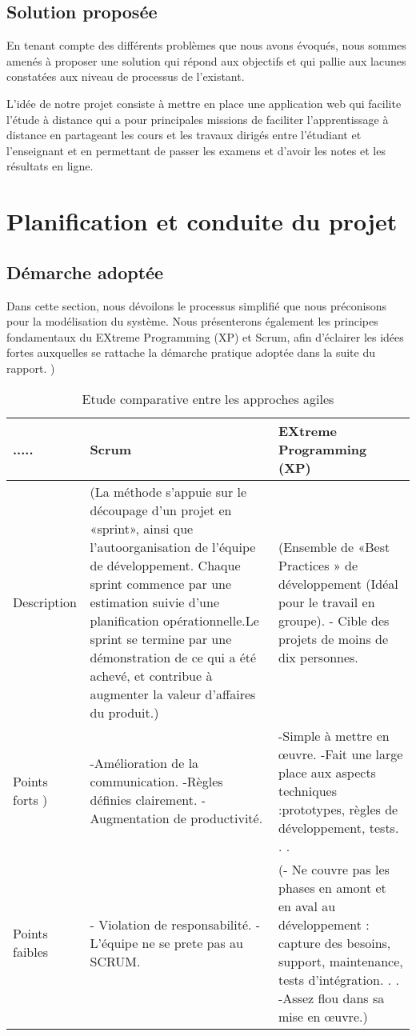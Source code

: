 \subsection{Solution proposée}
En tenant compte des différents problèmes que nous avons évoqués, nous sommes amenés à
proposer une solution qui répond aux objectifs et qui pallie aux lacunes constatées aux niveau
de processus de l’existant.

 L’idée de notre projet consiste à mettre en place une application
web qui facilite l’étude à distance qui a pour principales missions de faciliter l’apprentissage
à distance en partageant les cours et les travaux dirigés entre l’étudiant et l’enseignant et en
permettant de passer les examens et d’avoir les notes et les résultats en ligne. 
\section{Planification et conduite du projet}
\subsection{Démarche adoptée}
Dans cette section, nous dévoilons le processus simplifié que nous préconisons pour la modélisation du système.
Nous présenterons également les principes fondamentaux du EXtreme Programming (XP) et
Scrum, afin d’éclairer les idées fortes auxquelles se rattache la démarche pratique adoptée dans
la suite du rapport.
	)
\begin{table} [!ht]
	\centering
	\begin{tabular} { | m{5em} | m{7cm}| m{6cm} | }\hline
		\rowcolor[gray]{0.85}
		..... & Scrum &EXtreme Programming (XP) \\  \hline
		Description      & \small (La méthode s’appuie sur le découpage d’un
		projet en «sprint»,
		ainsi que l’autoorganisation de
		l’équipe de développement.
		Chaque sprint commence par une
		estimation suivie
		d’une planification
		opérationnelle.Le
		sprint se termine par
		une démonstration de
		ce qui a été achevé, et
		contribue à augmenter
		la valeur d’affaires du
		produit.)
		& \small (Ensemble de «Best
		Practices » de développement (Idéal pour
		le travail en groupe).
		- Cible des projets
		de moins de dix personnes.    \\    \hline
		Points forts )     &-Amélioration de la
		communication.
		-Règles définies clairement.
		-Augmentation de
		productivité.
		& -Simple à mettre en
		œuvre.
		-Fait une large place
		aux aspects techniques :prototypes,
		règles de développement, tests. . .  \\    \hline
		Points faibles    &  - Violation de responsabilité.
		-L’équipe ne se prete
		pas au SCRUM.&\small (- Ne couvre pas les
		phases en amont et
		en aval au développement : capture des besoins, support, maintenance, tests d’intégration. . .
		-Assez flou dans sa
		mise en œuvre.)   \\    \hline	
		
	\end{tabular}
	\caption{ Etude comparative entre les approches agiles}\label{tab: first-table}	
\end{table}

